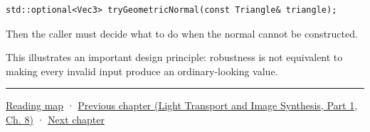 \begin{verbatim}
std::optional<Vec3> tryGeometricNormal(const Triangle& triangle);
\end{verbatim}

Then the caller must decide what to do when the normal cannot be constructed.

This illustrates an important design principle: robustness is not equivalent to making every invalid input produce an ordinary-looking value.

\begin{center}\rule{0.5\linewidth}{0.5pt}\end{center}

\hyperref[volume-reading-map]{Reading map} · \href{../04-Light-Transport-and-Image-Synthesis-P01/main.pdf\#nameddest=03-visual-computing-i-ch019-textures-as-sampled-surface-signals}{Previous chapter (Light Transport and Image Synthesis, Part 1, Ch. 8)} · \hyperref[03-visual-computing-i-ch021-collision-implementations-and-repository-comparison]{Next chapter}
